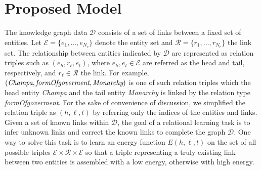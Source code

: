 \documentclass[9pt]{sig-alternate-05-2015}
\begin{document}
\section{Proposed Model} \label{math}
The knowledge graph data $\mathcal{D}$ consists of a set of links between a fixed set of entities. Let $\mathcal{E} = \{e_1, \ldots, e_{N_e}\}$ denote the entity set and $\mathcal{R} = \{r_1, \ldots, r_{N_r}\}$ the link set.  The relationship between entities indicated by $\mathcal{D}$ are represented as relation triples such as $(e_h,r_{\ell},e_t)$, where $e_h, e_t\in \mathcal{E}$ are referred as the head  and tail, respectively, and  $r_{\ell} \in \mathcal{R}$ the link.  For example, $(\emph{Champa}, \emph{formOfgoverment}, \emph{Monarchy})$ is one of such relation triples which the head entity \emph{Champa} and the tail entity \emph{Monarchy} is linked by the relation type \emph{formOfgoverment}.  For the sake of convenience of discussion, we simplified the relation triple as $(h,\ell, t)$   by referring only the indices of the entities and links. Given a set of known links within $\mathcal{D}$, the goal of a relational learning task is to  infer unknown links and correct the known links to complete the graph $\mathcal{D}$. One way to solve this task is to learn an energy function $E(h, \ell, t)$ on the set of all possible triples $\mathcal{E} \times \mathcal{R} \times \mathcal{E}$ so that a triple representing a truly existing link between two entities  is assembled with a low energy, otherwise with high energy. 

\end{document}
